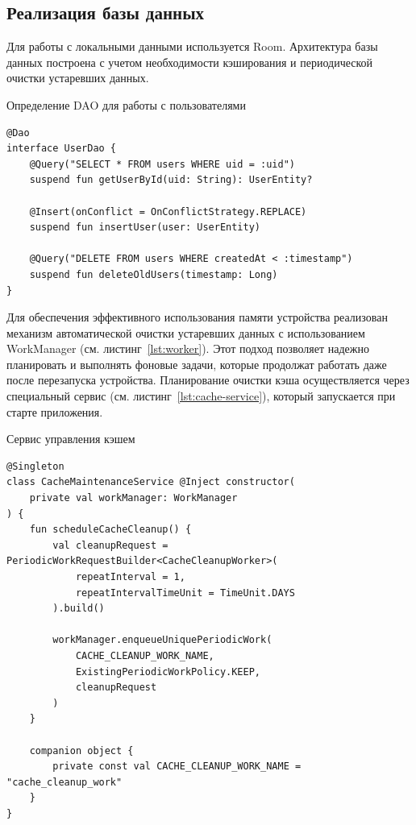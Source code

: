 \documentclass[14pt, russian]{scrartcl}
\begin{document}
\subsection{Реализация базы данных}\label{sect:database}

Для работы с локальными данными используется Room. Архитектура базы данных построена с учетом необходимости кэширования и периодической очистки устаревших данных.

\begin{listing}[!htb]
\caption{Определение DAO для работы с пользователями}
\label{lst:user-dao}
\begin{verbatim}
@Dao
interface UserDao {
    @Query("SELECT * FROM users WHERE uid = :uid")
    suspend fun getUserById(uid: String): UserEntity?

    @Insert(onConflict = OnConflictStrategy.REPLACE)
    suspend fun insertUser(user: UserEntity)

    @Query("DELETE FROM users WHERE createdAt < :timestamp")
    suspend fun deleteOldUsers(timestamp: Long)
}
\end{verbatim}
\end{listing}

Для обеспечения эффективного использования памяти устройства реализован механизм автоматической очистки устаревших данных с использованием WorkManager (см. листинг~\ref{lst:worker}). Этот подход позволяет надежно планировать и выполнять фоновые задачи, которые продолжат работать даже после перезапуска устройства. Планирование очистки кэша осуществляется через специальный сервис (см. листинг~\ref{lst:cache-service}), который запускается при старте приложения.

\begin{listing}[!htb]
\caption{Сервис управления кэшем}
\label{lst:cache-service}
\begin{verbatim}
@Singleton
class CacheMaintenanceService @Inject constructor(
    private val workManager: WorkManager
) {
    fun scheduleCacheCleanup() {
        val cleanupRequest = PeriodicWorkRequestBuilder<CacheCleanupWorker>(
            repeatInterval = 1,
            repeatIntervalTimeUnit = TimeUnit.DAYS
        ).build()

        workManager.enqueueUniquePeriodicWork(
            CACHE_CLEANUP_WORK_NAME,
            ExistingPeriodicWorkPolicy.KEEP,
            cleanupRequest
        )
    }

    companion object {
        private const val CACHE_CLEANUP_WORK_NAME = "cache_cleanup_work"
    }
}
\end{verbatim}
\end{listing}
\end{document}
